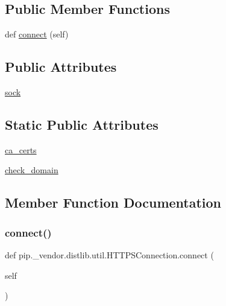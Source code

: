 \subsection*{Public Member Functions}
\begin{DoxyCompactItemize}
\item 
def \hyperlink{classpip_1_1__vendor_1_1distlib_1_1util_1_1HTTPSConnection_a75ddf67a0040ad93ebdec7d157e42273}{connect} (self)
\end{DoxyCompactItemize}
\subsection*{Public Attributes}
\begin{DoxyCompactItemize}
\item 
\hyperlink{classpip_1_1__vendor_1_1distlib_1_1util_1_1HTTPSConnection_a641ba20eab4cf066dc85e3b6681e9eb3}{sock}
\end{DoxyCompactItemize}
\subsection*{Static Public Attributes}
\begin{DoxyCompactItemize}
\item 
\hyperlink{classpip_1_1__vendor_1_1distlib_1_1util_1_1HTTPSConnection_a90d5d730a4a0eae32549eaa200e4096d}{ca\+\_\+certs}
\item 
\hyperlink{classpip_1_1__vendor_1_1distlib_1_1util_1_1HTTPSConnection_a26b2ef75a6acec6bb3552b563e51746f}{check\+\_\+domain}
\end{DoxyCompactItemize}


\subsection{Member Function Documentation}
\mbox{\label{classpip_1_1__vendor_1_1distlib_1_1util_1_1HTTPSConnection_a75ddf67a0040ad93ebdec7d157e42273}} 
\subsubsection{\texorpdfstring{connect()}{connect()}}
{\footnotesize\ttfamily def pip.\+\_\+vendor.\+distlib.\+util.\+H\+T\+T\+P\+S\+Connection.\+connect (\begin{DoxyParamCaption}\item[{}]{self }\end{DoxyParamCaption})}



